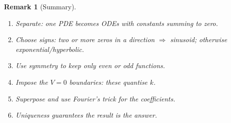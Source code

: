 \documentclass{article}
\newtheorem{remark}{Remark}
\begin{document}
\begin{remark}[Summary]
    \begin{enumerate}
        \item Separate: one PDE becomes ODEs with constants summing to zero.
        \item Choose signs: two or more zeros in a direction $\Rightarrow$ sinusoid; otherwise exponential/hyperbolic.
        \item Use symmetry to keep only even or odd functions.
        \item Impose the $V = 0$ boundaries: these quantise $k$.
        \item Superpose and use Fourier's trick for the coefficients.
        \item Uniqueness guarantees the result is the answer.
    \end{enumerate}
\end{remark}
\end{document}
